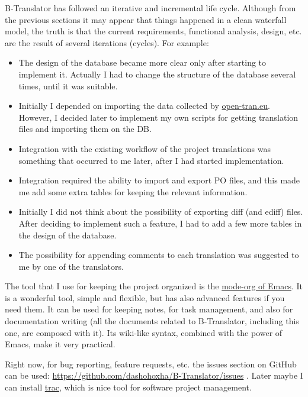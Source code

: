\documentclass[11pt]{article}
\begin{document}
  B-Translator has followed an iterative and incremental life cycle.
  Although from the previous sections it may appear that things
  happened in a clean waterfall model, the truth is that the current
  requirements, functional analysis, design, etc. are the result of
  several iterations (cycles). For example:
\begin{itemize}
\item The design of the database became more clear only after starting
    to implement it. Actually I had to change the structure of the
    database several times, until it was suitable.
\item Initially I depended on importing the data collected by
    \href{http://open-tran.eu/}{open-tran.eu}. However, I decided later to implement my own scripts
    for getting translation files and importing them on the DB.
\item Integration with the existing workflow of the project translations
    was something that occurred to me later, after I had started
    implementation.
\item Integration required the ability to import and export PO files,
    and this made me add some extra tables for keeping the relevant
    information.
\item Initially I did not think about the possibility of exporting diff
    (and ediff) files.  After deciding to implement such a feature, I
    had to add a few more tables in the design of the database.
\item The possibility for appending comments to each translation was
    suggested to me by one of the translators.
\end{itemize}
  The tool that I use for keeping the project organized is the
  \href{http://orgmode.org/}{mode-org of Emacs}. It is a wonderful tool, simple and flexible, but
  has also advanced features if you need them. It can be used for
  keeping notes, for task management, and also for documentation
  writing (all the documents related to B-Translator, including this
  one, are composed with it). Its wiki-like syntax, combined with the
  power of Emacs, make it very practical.

  Right now, for bug reporting, feature requests, etc. the issues
  section on GitHub can be used:
  \href{https://github.com/dashohoxha/B-Translator/issues}{https://github.com/dashohoxha/B-Translator/issues} . Later maybe I
  can install \href{http://trac.edgewall.org/}{trac}, which is nice tool for software project
  management.
\end{document}

